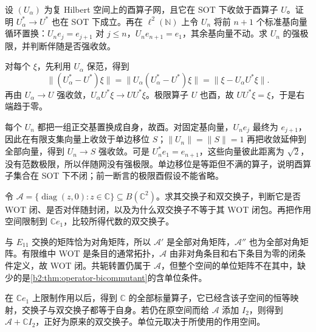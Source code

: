 \begin{exercise}\label{b2:ex:D-adjoint-strong}
	设 \((U_\alpha)\) 为复 Hilbert 空间上的酉算子网，且它在 SOT 下收敛于酉算子 \(U\)。证明 \(U_\alpha^*\to U^*\) 也在 SOT 下成立。再在 \(\ell^2(\mathbb N)\) 上令 \(U_n\) 将前 \(n+1\) 个标准基向量循环置换：\(U_ne_j=e_{j+1}\) 对 \(j\le n\)，\(U_ne_{n+1}=e_1\)，其余基向量不动。求 \(U_n\) 的强极限，并判断伴随是否强收敛。
\end{exercise}
\begin{solution}
	对每个 \(\xi\)，先利用 \(U_\alpha\) 保范，得到
	\[
		\|(U_\alpha^*-U^*)\xi\| =\|U_\alpha(U_\alpha^*-U^*)\xi\| =\|\xi-U_\alpha U^*\xi\|.
	\]
	再由 \(U_\alpha\to U\) 强收敛，\(U_\alpha U^*\xi\to UU^*\xi\)。极限算子 \(U\) 也酉，故 \(UU^*\xi=\xi\)，于是右端趋于零。

	每个 \(U_n\) 都把一组正交基置换成自身，故酉。对固定基向量，\(U_ne_j\) 最终为 \(e_{j+1}\)，因此在有限支集向量上收敛于单边移位 \(S\)；\(\|U_n\|=\|S\|=1\) 再把收敛延伸到全部向量，得到 \(U_n\to S\) 强收敛。可是 \(U_n^*e_1=e_{n+1}\)，这些向量彼此距离为 \(\sqrt2\)，没有范数极限，所以伴随网没有强极限。单边移位是等距但不满的算子，说明酉算子集合在 SOT 下不闭；前一断言的极限酉假设不能省略。
\end{solution}

\begin{exercise}\label{b2:ex:D-selfadjoint-hypothesis}
	令 \(\mathcal A=\{\operatorname{diag}(z,0):z\in\mathbb C\}\subseteq B(\mathbb C^2)\)。求其交换子和双交换子，判断它是否 WOT 闭、是否对伴随封闭，以及为什么双交换子不等于其 WOT 闭包。再把作用空间限制到 \(\mathbb Ce_1\)，比较所得代数的双交换子。
\end{exercise}
\begin{solution}
	与 \(E_{11}\) 交换的矩阵恰为对角矩阵，所以 \(\mathcal A'\) 是全部对角矩阵，\(\mathcal A''\) 也为全部对角矩阵。有限维中 WOT 是条目的通常拓扑，\(\mathcal A\) 由非对角条目和右下条目为零的闭条件定义，故 WOT 闭。共轭转置仍属于 \(\mathcal A\)，但整个空间的单位矩阵不在其中，缺少的是\cref{b2:thm:operator-bicommutant}的含单位条件。

	在 \(\mathbb Ce_1\) 上限制作用以后，得到 \(\mathbb C\) 的全部标量算子，它已经含该子空间的恒等映射，交换子与双交换子都等于自身。若仍在原空间而给 \(\mathcal A\) 添加 \(I_2\)，则得到 \(\mathcal A+\mathbb CI_2\)，正好为原来的双交换子。单位元取决于所使用的作用空间。
\end{solution}

